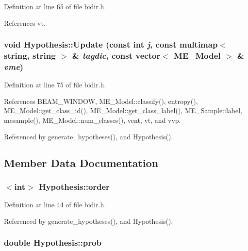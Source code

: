 Definition at line 65 of file bidir.h.

References vt.\hypertarget{structHypothesis_890db467cee870f4f2bbaab38a1c7dcf}{
\subsubsection[{Update}]{\setlength{\rightskip}{0pt plus 5cm}void Hypothesis::Update (const int {\em j}, \/  const multimap$<$ string, string $>$ \& {\em tagdic}, \/  const {\bf vector}$<$ {\bf ME\_\-Model} $>$ \& {\em vme})}}
\label{structHypothesis_890db467cee870f4f2bbaab38a1c7dcf}




Definition at line 75 of file bidir.h.

References BEAM\_\-WINDOW, ME\_\-Model::classify(), entropy(), ME\_\-Model::get\_\-class\_\-id(), ME\_\-Model::get\_\-class\_\-label(), ME\_\-Sample::label, mesample(), ME\_\-Model::num\_\-classes(), vent, vt, and vvp.

Referenced by generate\_\-hypotheses(), and Hypothesis().

\subsection{Member Data Documentation}
\hypertarget{structHypothesis_52746abb6a7c86a554f65544457b604b}{
\subsubsection[{order}]{$<$int$>$ {\bf Hypothesis::order}}}
\label{structHypothesis_52746abb6a7c86a554f65544457b604b}




Definition at line 44 of file bidir.h.

Referenced by generate\_\-hypotheses(), and Hypothesis().\hypertarget{structHypothesis_b713fec07803264399fd86adfa5800fd}{
\subsubsection[{prob}]{\setlength{\rightskip}{0pt plus 5cm}double {\bf Hypothesis::prob}}}
\label{structHypothesis_b713fec07803264399fd86adfa5800fd}




